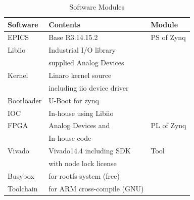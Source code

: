 \documentclass[journal,reqno]{IEEEtran}
\begin{document}
\begin{table}[h!t]
	\centering
	\caption{Software Modules}
	\label{sw-conf}
	
	\begin{tabular}{@{}lll@{}}
		
		\hline
		\textbf{Software} & \textbf{Contents}                 & \textbf{Module}     \\
		\hline
		EPICS        & Base R3.14.15.2                       & PS of Zynq            \\
		Libiio       & Industrial I/O library                &                       \\
		& supplied Analog Devices               &                       \\         
		Kernel       & Linaro kernel source                  &                       \\
		& including iio device driver           &                       \\         
		Bootloader   & U-Boot for zynq                       &                       \\
		IOC          & In-house using Libiio                 &                       \\
		
		\hline
		FPGA         & Analog Devices and                    & PL of Zynq            \\
		& In-house code                         &                       \\
		
		\hline
		Vivado       & Vivado14.4 including SDK              & Tool                  \\        
		& with node lock license                &                       \\            
		Busybox      & for rootfs system (free)              &                       \\
		Toolchain    & for ARM cross-compile (GNU)           &                       \\        
		\hline
		
	\end{tabular}
\end{table}
\end{document}
